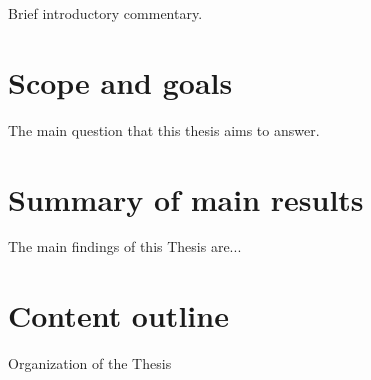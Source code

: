 \ifnum{}

Brief introductory commentary.

\section{Scope and goals}
The main question that this thesis aims to answer.

\section{Summary of main results}
The main findings of this Thesis are...

\section{Content outline}
Organization of the Thesis

\else

